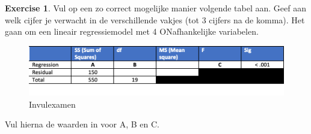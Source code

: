 \documentclass[
]{book}
\theoremstyle{definition}
\theoremstyle{definition}
\theoremstyle{definition}
\newtheorem{exercise}{Exercise}[chapter]
\theoremstyle{definition}
\theoremstyle{remark}
\begin{document}
\begin{exercise}
Vul op een zo correct mogelijke manier volgende tabel aan. Geef aan welk cijfer je verwacht in de verschillende vakjes (tot 3 cijfers na de komma). Het gaan om een lineair regressiemodel met 4 ONafhankelijke variabelen.

\begin{figure}
\includegraphics[width=0.9\linewidth]{img/exam_2} \caption{Invulexamen}\label{fig:exam2}
\end{figure}

Vul hierna de waarden in voor A, B en C.
\end{exercise}
\end{document}

